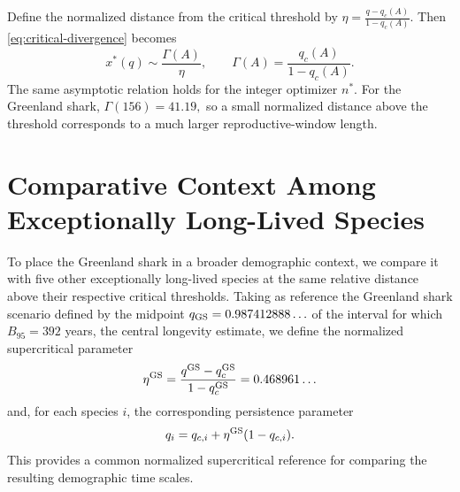 \documentclass[11pt,a4paper]{amsart}
\begin{document}
{ Define the normalized distance from the critical threshold by
${\displaystyle \eta
	=
	\frac{q-q_c(A)}{1-q_c(A)}. }$
Then \eqref{eq:critical-divergence} becomes
\begin{equation}
x^*(q)
\sim
\frac{\Gamma(A)}{\eta},
\qquad
\Gamma(A)
=
\frac{q_c(A)}{1-q_c(A)}.
\label{eq:amplification-factor}
\end{equation}
The same asymptotic relation holds for the integer optimizer \(n^*\).
For the Greenland shark,
$
\Gamma(156)=41.19,
$
so a small normalized distance above the threshold corresponds to a
much larger reproductive-window length.



}

\section{Comparative Context Among Exceptionally Long-Lived Species}
\label{app:comparative_context}

To place the Greenland shark in a broader demographic context, we compare
it with five other exceptionally long-lived species at the same relative
distance above their respective critical thresholds.
Taking as reference the Greenland shark scenario defined by the midpoint
\(q_{\rm GS}=0.987412888\ldots\) of the interval for which
\(B_{95}=392\) years, the central longevity estimate, we define the normalized supercritical parameter
\[
\eta^{\rm GS}=
\frac{q^{\rm GS}-q_c^{\rm GS}}
{1-q_c^{\rm GS}}
=
0.468961\ldots
\]
and, for each species \(i\), the corresponding persistence parameter
\[
q_i=q_{c,i}+\eta^{\rm GS} (1-q_{c,i}).
\]
This provides a common normalized supercritical reference for comparing
the resulting demographic time scales.
\end{document}
